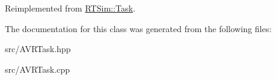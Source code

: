 Reimplemented from \hyperlink{classRTSim_1_1Task_a20ba7201d13480a1328686666b916c3e}{R\+T\+Sim\+::\+Task}.



The documentation for this class was generated from the following files\+:\begin{DoxyCompactItemize}
\item 
src/A\+V\+R\+Task.\+hpp\item 
src/A\+V\+R\+Task.\+cpp\end{DoxyCompactItemize}
